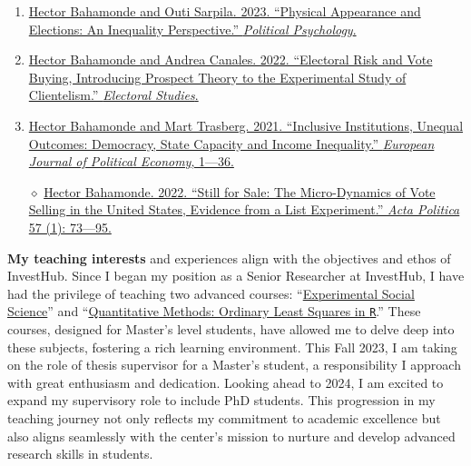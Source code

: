 \documentclass[10pt,stdletter,dateno,sigleft]{newlfm} %
\begin{document}
\begin{newlfm}
\begin{enumerate}
  \item \href{https://doi.org/10.1111/pops.12940}{Hector Bahamonde and Outi Sarpila. 2023. ``Physical Appearance and Elections: An Inequality Perspective.'' \emph{Political Psychology}.}
  \item \href{https://doi.org/10.1016/j.electstud.2022.102497}{Hector Bahamonde and Andrea Canales. 2022. ``Electoral Risk and Vote Buying, Introducing Prospect Theory to the Experimental Study of Clientelism.'' \emph{Electoral Studies}.}
  \item \href{https://doi.org/10.1016/j.ejpoleco.2021.102048}{Hector Bahamonde and Mart Trasberg. 2021. ``Inclusive Institutions, Unequal Outcomes: Democracy, State Capacity and Income Inequality.'' \emph{European Journal of Political Economy}, 1---36.}
  \item[$\diamond$] \href{https://link.springer.com/article/10.1057/s41269-020-00174-4}{Hector Bahamonde. 2022. ``Still for Sale: The Micro-Dynamics of Vote Selling in the United States, Evidence from a List Experiment.'' \emph{Acta Politica} 57 (1): 73---95.}
\end{enumerate}


{\bf My teaching interests} and experiences align with the objectives and ethos of InvestHub. Since I began my position as a Senior Researcher at InvestHub, I have had the privilege of teaching two advanced courses: ``\href{https://github.com/hbahamonde/Exp_Soc_Science/raw/main/Bahamonde_Exp_Soc_Sci.pdf}{Experimental Social Science}'' and ``\href{https://github.com/hbahamonde/OLS/raw/master/Bahamonde_OLS.pdf}{Quantitative Methods: Ordinary Least Squares in \texttt{R}}.'' These courses, designed for Master's level students, have allowed me to delve deep into these subjects, fostering a rich learning environment. This Fall 2023, I am taking on the role of thesis supervisor for a Master's student, a responsibility I approach with great enthusiasm and dedication. Looking ahead to 2024, I am excited to expand my supervisory role to include PhD students. This progression in my teaching journey not only reflects my commitment to academic excellence but also aligns seamlessly with the center's mission to nurture and develop advanced research skills in students.


\end{newlfm}
\end{document}
